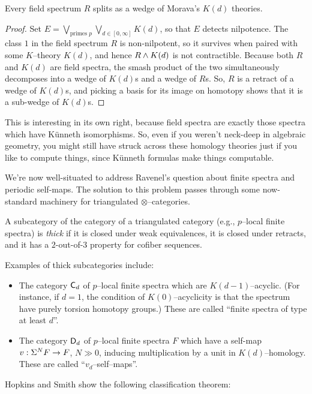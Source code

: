 \begin{corollary}
Every field spectrum $R$ splits as a wedge of Morava's $K(d)$ theories.
\end{corollary}
\begin{proof}
Set $E = \bigvee_{\text{primes $p$}} \bigvee_{d \in [0, \infty]} K(d)$, so that $E$ detects nilpotence.  The class $1$ in the field spectrum $R$ is non-nilpotent, so it survives when paired with some $K$--theory $K(d)$, and hence $R \wedge K(d)$ is not contractible.  Because both $R$ and $K(d)$ are field spectra, the smash product of the two simultaneously decomposes into a wedge of $K(d)$s and a wedge of $R$s.  So, $R$ is a retract of a wedge of $K(d)$s, and picking a basis for its image on homotopy shows that it is a sub-wedge of $K(d)$s.
\end{proof}

\begin{remark}
This is interesting in its own right, because field spectra are exactly those spectra which have K\"unneth isomorphisms.  So, even if you weren't neck-deep in algebraic geometry, you might still have struck across these homology theories just if you like to compute things, since K\"unneth formulas make things computable.
\end{remark}

We're now well-situated to address Ravenel's question about finite spectra and periodic self-maps.  The solution to this problem passes through some now-standard machinery for triangulated $\otimes$--categories.

\begin{definition}
A subcategory of the category of a triangulated category (e.g., $p$--local finite spectra) is \textit{thick} if it is closed under weak equivalences, it is closed under retracts, and it has a $2$-out-of-$3$ property for cofiber sequences.
\end{definition}

\noindent Examples of thick subcategories include:
\begin{itemize}
\item The category $\mathsf{C}_d$ of $p$--local finite spectra which are $K(d-1)$--acyclic.  (For instance, if $d = 1$, the condition of $K(0)$--acyclicity is that the spectrum have purely torsion homotopy groups.)  These are called ``finite spectra of type at least $d$''.
\item The category $\mathsf{D}_d$ of $p$--local finite spectra $F$ which have a self-map $v: \Sigma^N F \to F$, $N \gg 0$, inducing multiplication by a unit in $K(d)$--homology.  These are called ``$v_d$--self--maps''.
\end{itemize}
Hopkins and Smith show the following classification theorem:

